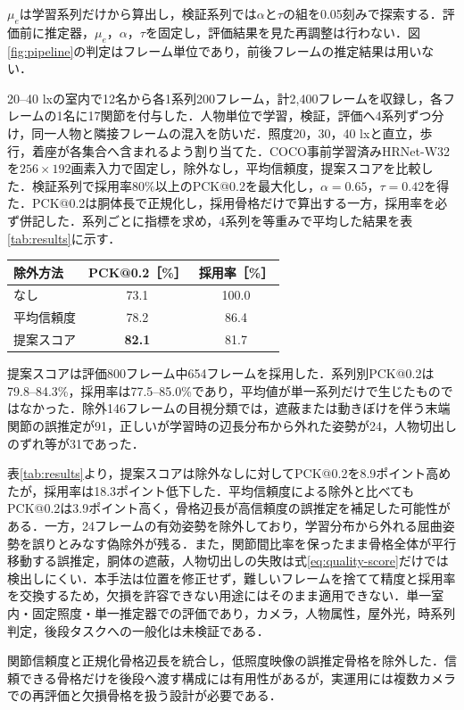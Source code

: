 $\mu_e$は学習系列だけから算出し，検証系列では$\alpha$と$\tau$の組を0.05刻みで探索する．評価前に推定器，$\mu_e$，$\alpha$，$\tau$を固定し，評価結果を見た再調整は行わない．図\ref{fig:pipeline}の判定はフレーム単位であり，前後フレームの推定結果は用いない．

20--40 lxの室内で12名から各1系列200フレーム，計2,400フレームを収録し，各フレームの1名に17関節を付与した．人物単位で学習，検証，評価へ4系列ずつ分け，同一人物と隣接フレームの混入を防いだ．照度20，30，40 lxと直立，歩行，着座が各集合へ含まれるよう割り当てた．COCO事前学習済みHRNet-W32を$256\times192$画素入力で固定し，除外なし，平均信頼度，提案スコアを比較した．検証系列で採用率80\%以上のPCK@0.2を最大化し，$\alpha=0.65$，$\tau=0.42$を得た．PCK@0.2は胴体長で正規化し，採用骨格だけで算出する一方，採用率を必ず併記した．系列ごとに指標を求め，4系列を等重みで平均した結果を表\ref{tab:results}に示す．

\begin{center}
\small
{}
\label{tab:results}
\begin{tabular}{lcc}
\toprule
除外方法 & PCK@0.2［\%］ & 採用率［\%］ \\
\midrule
なし & 73.1 & 100.0 \\
平均信頼度 & 78.2 & 86.4 \\
提案スコア & \textbf{82.1} & 81.7 \\
\bottomrule
\end{tabular}
\end{center}

提案スコアは評価800フレーム中654フレームを採用した．系列別PCK@0.2は79.8--84.3\%，採用率は77.5--85.0\%であり，平均値が単一系列だけで生じたものではなかった．除外146フレームの目視分類では，遮蔽または動きぼけを伴う末端関節の誤推定が91，正しいが学習時の辺長分布から外れた姿勢が24，人物切出しのずれ等が31であった．

表\ref{tab:results}より，提案スコアは除外なしに対してPCK@0.2を8.9ポイント高めたが，採用率は18.3ポイント低下した．平均信頼度による除外と比べてもPCK@0.2は3.9ポイント高く，骨格辺長が高信頼度の誤推定を補足した可能性がある．一方，24フレームの有効姿勢を除外しており，学習分布から外れる屈曲姿勢を誤りとみなす偽除外が残る．また，関節間比率を保ったまま骨格全体が平行移動する誤推定，胴体の遮蔽，人物切出しの失敗は式\eqref{eq:quality-score}だけでは検出しにくい．本手法は位置を修正せず，難しいフレームを捨てて精度と採用率を交換するため，欠損を許容できない用途にはそのまま適用できない．単一室内・固定照度・単一推定器での評価であり，カメラ，人物属性，屋外光，時系列判定，後段タスクへの一般化は未検証である．

関節信頼度と正規化骨格辺長を統合し，低照度映像の誤推定骨格を除外した．信頼できる骨格だけを後段へ渡す構成には有用性があるが，実運用には複数カメラでの再評価と欠損骨格を扱う設計が必要である．
